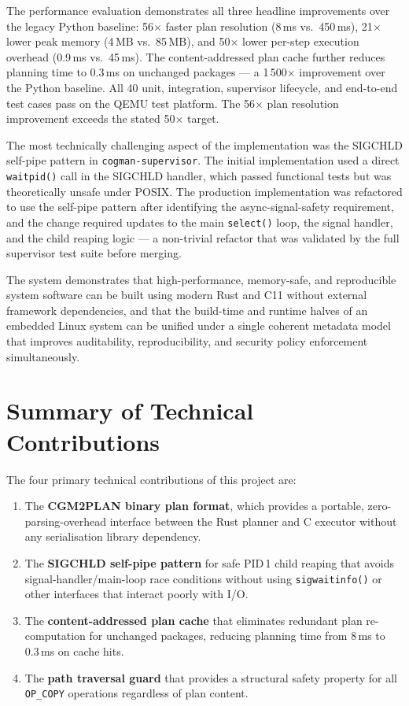 \documentclass[12pt,a4paper]{report}
\begin{document}
The performance evaluation demonstrates all three headline improvements over the
legacy Python baseline: 56$\times$ faster plan resolution (8\,ms vs.\
450\,ms), 21$\times$ lower peak memory (4\,MB vs.\ 85\,MB), and
50$\times$ lower per-step execution overhead (0.9\,ms vs.\ 45\,ms). The
content-addressed plan cache further reduces planning time to 0.3\,ms on unchanged
packages --- a 1\,500$\times$ improvement over the Python baseline. All 40 unit,
integration, supervisor lifecycle, and end-to-end test cases pass on the QEMU test
platform. The 56$\times$ plan resolution improvement exceeds the stated 50$\times$
target.

The most technically challenging aspect of the implementation was the SIGCHLD
self-pipe pattern in \texttt{cogman-supervisor}. The initial implementation used a
direct \texttt{waitpid()} call in the SIGCHLD handler, which passed functional
tests but was theoretically unsafe under POSIX. The production implementation was
refactored to use the self-pipe pattern after identifying the async-signal-safety
requirement, and the change required updates to the main \texttt{select()} loop,
the signal handler, and the child reaping logic --- a non-trivial refactor that was
validated by the full supervisor test suite before merging.

The system demonstrates that high-performance, memory-safe, and reproducible
system software can be built using modern Rust and C11 without external framework
dependencies, and that the build-time and runtime halves of an embedded Linux
system can be unified under a single coherent metadata model that improves
auditability, reproducibility, and security policy enforcement simultaneously.

\section{Summary of Technical Contributions}

The four primary technical contributions of this project are:

\begin{enumerate}[leftmargin=2em, itemsep=3pt]
  \item The \textbf{CGM2PLAN binary plan format}, which provides a portable,
        zero-parsing-overhead interface between the Rust planner and C executor
        without any serialisation library dependency.
  \item The \textbf{SIGCHLD self-pipe pattern} for safe PID\,1 child reaping that
        avoids signal-handler/main-loop race conditions without using
        \texttt{sigwaitinfo()} or other interfaces that interact poorly with I/O.
  \item The \textbf{content-addressed plan cache} that eliminates redundant plan
        re-computation for unchanged packages, reducing planning time from 8\,ms
        to 0.3\,ms on cache hits.
  \item The \textbf{path traversal guard} that provides a structural safety
        property for all \texttt{OP\_COPY} operations regardless of plan content.
\end{enumerate}
\end{document}

